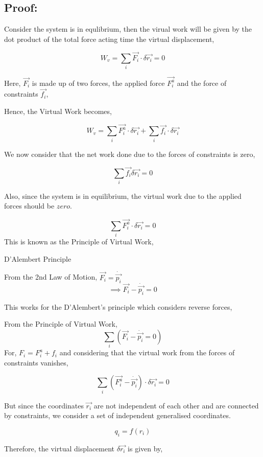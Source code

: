 \documentclass[a4paper]{article}
\begin{document}
		\subsection*{Proof: }

			Consider the system is in equlibrium, then the virual work will be given by the dot product of the total force acting time the virtual displacement,

			$$ W_v = \sum_i \vec{F_i} \cdot \delta \vec{r_i} = 0 $$

			Here, $\vec{F_i}$ is made up of two forces, the applied force $\vec{F_i^a}$ and the force of constraints $\vec{f_i}$,

			Hence, the Virtual Work becomes,

			$$ W_v = \sum_i \vec{F_i^a} \cdot \delta \vec{r_i} + \sum_i \vec{f_i} \cdot \delta \vec{r_i} $$

			We now consider that the net work done due to the forces of constraints is zero, 

			$$ \sum_i \vec{f_i} \delta \vec{r_i} = 0 $$

			Also, since the system is in equilibrium, the virtual work due to the applied forces should be $zero$.

			\begin{equation}
				\sum_i \vec{F_i^a} \cdot \delta \vec{r_i} = 0 \label{eq_pvw} 
			\end{equation} 		
			This is known as the Principle of Virtual Work, 
			
			D'Alembert Principle
			
			From the 2nd Law of Motion, $\vec{F_i} = \dot{\vec{p_i}}$
			$$ \implies \vec{F_i} - \dot{\vec{p_i}} = 0 $$
			
			This works for the D'Alembert's principle which considers reverse forces,

			From the Principle of Virtual Work,
				$$ \sum_i ( \vec{F_i} - \dot{\vec{p_i}} = 0 ) $$
			For, $F_i = F_i^a + f_i$ and considering that the virtual work from the forces of constraints vanishes, 

			$$ \sum_i(\vec{F_i^a} - \dot{\vec{p_i}}) \cdot \delta \vec{r_i} = 0 $$
			
			But since the coordinates $\vec{r_i}$ are not independent of each other and are connected by constraints, we consider a set of independent generalised coordinates.

			$$ q_i = f(r_i) $$

			Therefore, the virtual displacement $\delta \vec{r_i}$ is given by,
\end{document}
